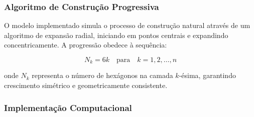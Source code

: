 \documentclass[12pt,a4paper,oneside]{extarticle}
\begin{document}
\subsubsection{Algoritmo de Construção Progressiva}
O modelo implementado simula o processo de construção natural através de um algoritmo de expansão radial, iniciando em pontos centrais e expandindo concentricamente. A progressão obedece à sequência:

\begin{equation}
N_k = 6k \quad \text{para} \quad k = 1, 2, \ldots, n
\label{eq:progressive_growth}
\end{equation}

onde $N_k$ representa o número de hexágonos na camada $k$-ésima, garantindo crescimento simétrico e geometricamente consistente.

\subsubsection{Implementação Computacional}
\end{document}
